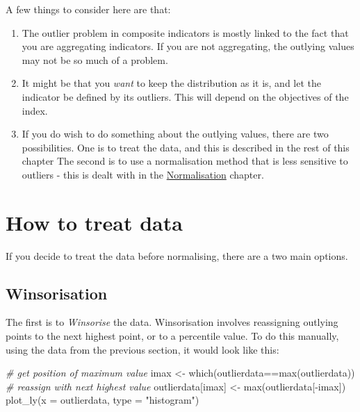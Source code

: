 \documentclass[
]{book}
\newenvironment{Shaded}{\begin{snugshade}}{\end{snugshade}}
\newcommand{\AttributeTok}[1]{\textcolor[rgb]{0.77,0.63,0.00}{#1}}
\newcommand{\CommentTok}[1]{\textcolor[rgb]{0.56,0.35,0.01}{\textit{#1}}}
\newcommand{\FunctionTok}[1]{\textcolor[rgb]{0.00,0.00,0.00}{#1}}
\newcommand{\NormalTok}[1]{#1}
\newcommand{\OtherTok}[1]{\textcolor[rgb]{0.56,0.35,0.01}{#1}}
\newcommand{\SpecialCharTok}[1]{\textcolor[rgb]{0.00,0.00,0.00}{#1}}
\newcommand{\StringTok}[1]{\textcolor[rgb]{0.31,0.60,0.02}{#1}}
\providecommand{\tightlist}{%
  \setlength{\itemsep}{0pt}\setlength{\parskip}{0pt}}
\begin{document}
A few things to consider here are that:

\begin{enumerate}
\def\labelenumi{\arabic{enumi}.}
\tightlist
\item
  The outlier problem in composite indicators is mostly linked to the fact that you are aggregating indicators. If you are not aggregating, the outlying values may not be so much of a problem.
\item
  It might be that you \emph{want} to keep the distribution as it is, and let the indicator be defined by its outliers. This will depend on the objectives of the index.
\item
  If you do wish to do something about the outlying values, there are two possibilities. One is to treat the data, and this is described in the rest of this chapter The second is to use a normalisation method that is less sensitive to outliers - this is dealt with in the \protect\hyperlink{normalisation-1}{Normalisation} chapter.
\end{enumerate}

\hypertarget{how-to-treat-data}{%
\section{How to treat data}\label{how-to-treat-data}}

If you decide to treat the data before normalising, there are a two main options.

\hypertarget{winsorisation}{%
\subsection{Winsorisation}\label{winsorisation}}

The first is to \emph{Winsorise} the data. Winsorisation involves reassigning outlying points to the next highest point, or to a percentile value. To do this manually, using the data from the previous section, it would look like this:

\begin{Shaded}
\begin{Highlighting}[]
\CommentTok{\# get position of maximum value}
\NormalTok{imax }\OtherTok{\textless{}{-}} \FunctionTok{which}\NormalTok{(outlierdata}\SpecialCharTok{==}\FunctionTok{max}\NormalTok{(outlierdata))}
\CommentTok{\# reassign with next highest value}
\NormalTok{outlierdata[imax] }\OtherTok{\textless{}{-}} \FunctionTok{max}\NormalTok{(outlierdata[}\SpecialCharTok{{-}}\NormalTok{imax])}
\FunctionTok{plot\_ly}\NormalTok{(}\AttributeTok{x =}\NormalTok{ outlierdata, }\AttributeTok{type =} \StringTok{"histogram"}\NormalTok{)}
\end{Highlighting}
\end{Shaded}
\end{document}
